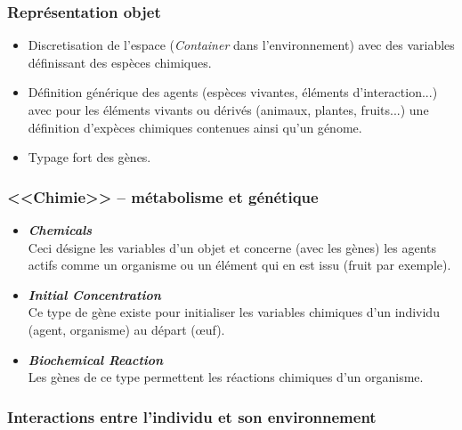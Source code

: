 \documentclass[11pt,twoside,a4paper]{article}
\begin{document}
\subsubsection{Repr{\'e}sentation objet}

\begin{itemize}
	\item Discretisation de l'espace (\emph{Container} dans l'environnement) avec des variables d{\'e}finissant des esp{\`e}ces chimiques. 
	\item D{\'e}finition g{\'e}n{\'e}rique des agents (esp{\`e}ces vivantes, {\'e}l{\'e}ments d'interaction...) avec pour les {\'e}l{\'e}ments vivants ou d{\'e}riv{\'e}s (animaux, plantes, fruits...) une d{\'e}finition d'exp{\`e}ces chimiques contenues ainsi qu'un g{\'e}nome. 
	\item Typage fort des g{\`e}nes. 
\end{itemize}

\subsubsection{<<Chimie>> -- m{\'e}tabolisme et g{\'e}n{\'e}tique}

\begin{itemize}
	\item \textbf{\emph{Chemicals}}~\\
Ceci d{\'e}signe les variables d'un objet et concerne (avec les g{\`e}nes) les agents actifs comme un organisme ou un {\'e}l{\'e}ment qui en est issu (fruit par exemple). 
	\item \textbf{\emph{Initial Concentration}}~\\
Ce type de g{\`e}ne existe pour initialiser les variables chimiques d'un individu (agent, organisme) au d{\'e}part (\oe uf). 
	\item \textbf{\emph{Biochemical Reaction}}~\\
Les g{\`e}nes de ce type permettent les r{\'e}actions chimiques d'un organisme. 
\end{itemize}

\subsubsection{Interactions entre l'individu et son environnement}
\end{document}
